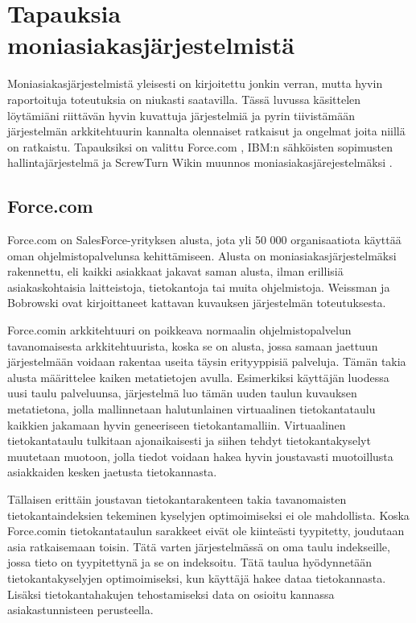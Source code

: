 \chapter{Tapauksia moniasiakasjärjestelmistä}
Moniasiakasjärjestelmistä yleisesti on kirjoitettu jonkin verran, mutta hyvin raportoituja toteutuksia on niukasti saatavilla. Tässä luvussa käsittelen löytämiäni riittävän hyvin kuvattuja järjestelmiä ja pyrin tiivistämään järjestelmän arkkitehtuurin kannalta olennaiset ratkaisut ja ongelmat joita niillä on ratkaistu. Tapauksiksi on valittu Force.com \cite{weissman2009design}, IBM:n sähköisten sopimusten hallintajärjestelmä \cite{kwok2008software} ja ScrewTurn Wikin muunnos moniasiakasjärejestelmäksi \cite{bezemer2010challenges}.


\section{Force.com}
Force.com on SalesForce-yrityksen alusta, jota yli 50 000 organisaatiota käyttää oman ohjelmistopalvelunsa kehittämiseen. Alusta on moniasiakasjärjestelmäksi rakennettu, eli kaikki asiakkaat jakavat saman alusta, ilman erillisiä asiakaskohtaisia laitteistoja, tietokantoja tai muita ohjelmistoja. Weissman ja Bobrowski ovat kirjoittaneet kattavan kuvauksen \cite{weissman2009design} järjestelmän toteutuksesta.

Force.comin arkkitehtuuri on poikkeava normaalin ohjelmistopalvelun tavanomaisesta arkkitehtuurista, koska se on alusta, jossa samaan jaettuun järjestelmään voidaan rakentaa useita täysin erityyppisiä palveluja. Tämän takia alusta määrittelee kaiken metatietojen avulla. Esimerkiksi käyttäjän luodessa uusi taulu palveluunsa, järjestelmä luo tämän uuden taulun kuvauksen metatietona, jolla mallinnetaan halutunlainen virtuaalinen tietokantataulu kaikkien jakamaan hyvin geneeriseen tietokantamalliin. Virtuaalinen tietokantataulu tulkitaan ajonaikaisesti ja siihen tehdyt tietokantakyselyt muutetaan muotoon, jolla tiedot voidaan hakea hyvin joustavasti muotoillusta asiakkaiden kesken jaetusta tietokannasta.

Tällaisen erittäin joustavan tietokantarakenteen takia tavanomaisten tietokantaindeksien tekeminen kyselyjen optimoimiseksi ei ole mahdollista. Koska Force.comin tietokantataulun sarakkeet eivät ole kiinteästi tyypitetty, joudutaan asia ratkaisemaan toisin. Tätä varten järjestelmässä on oma taulu indekseille, jossa tieto on tyypitettynä ja se on indeksoitu. Tätä taulua hyödynnetään tietokantakyselyjen optimoimiseksi, kun käyttäjä hakee dataa tietokannasta. Lisäksi tietokantahakujen tehostamiseksi data on osioitu kannassa asiakastunnisteen perusteella.



